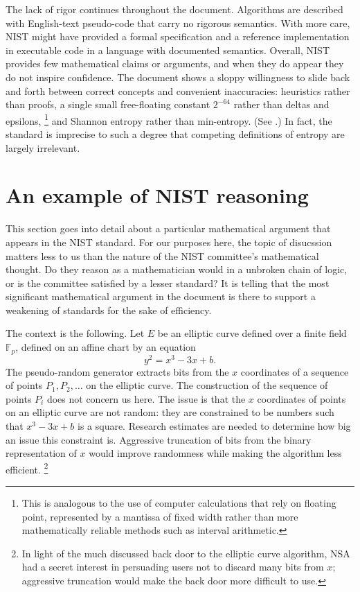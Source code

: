 \documentclass[11pt]{amsart} %
\newcommand{\ring}[1]{\mathbb{#1}}
\begin{document}
The lack of rigor continues throughout the document.  Algorithms are described with English-text
pseudo-code that carry no rigorous semantics.  With more care,  NIST might
have provided a formal specification and a reference implementation in executable code in a language
with documented semantics.
Overall, NIST provides few mathematical claims or arguments,
and when they do appear they do not inspire confidence.   The document shows a sloppy  willingness
to slide back and forth between correct concepts and  convenient inaccuracies:  
heuristics rather than proofs, a single small free-floating constant $2^{-64}$ rather than deltas and epsilons,%
\footnote{This is analogous to the use of
 computer calculations that rely on floating point, represented by a mantissa of
fixed width rather than more mathematically reliable methods such as interval arithmetic.}
and Shannon entropy rather than min-entropy.  (See \cite[Appendix C.2]{NIST}.)
In fact, the standard is imprecise to such a degree that competing definitions of entropy are largely irrelevant.

\section{An example of NIST reasoning}

This section goes into detail about a particular mathematical argument that appears in the
NIST standard.  For our purposes here, the topic of disucssion matters less to us than the nature of the NIST committee's mathematical
thought.  Do they reason as a mathematician would in a unbroken chain of logic, or is the committee
satisfied by a lesser standard? 
It is telling that
the most significant mathematical argument in the document is there to support a weakening
of standards for the sake of efficiency.

The context is the following.  Let $E$ be an elliptic curve defined over a finite field $\ring{F}_p$,
defined on an affine chart by an equation
\[
y^2 = x^3 - 3 x + b.
\]
The pseudo-random generator extracts bits from the
 $x$ coordinates of a sequence of points $P_1, P_2,\ldots $ 
on the elliptic curve.  The construction of the sequence of points $P_i$ does not concern us here.
The issue is that the $x$ coordinates of points on an elliptic curve are not random: they
are constrained to be numbers such that $x^3 - 3 x + b$ is a square.  Research estimates are needed to
determine how big an issue this constraint is.   Aggressive truncation of bits from the binary representation of $x$ would improve randomness
while making the algorithm less efficient.%
\footnote{In light of the much discussed back door to the elliptic curve algorithm, NSA had a secret interest
in persuading users not to discard many bits from  $x$; aggressive truncation would
make the back door more difficult to use.}
\end{document}
